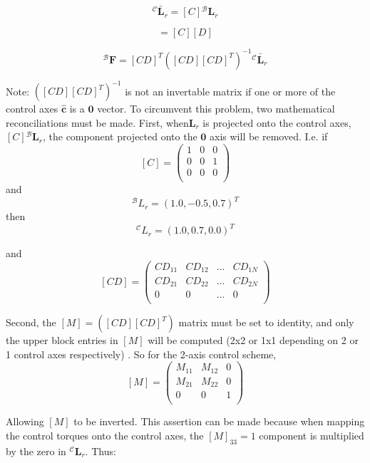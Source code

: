 \begin{equation}
	{}^{\mathcal{C}}\bar{\bm L}_{r} = [C] {}^{\mathcal{B}}\bm L_{r}
\end{equation}

\begin{equation}
	[CD] = [C][D]
\end{equation}

\begin{equation}
	\label{eq:th:min}
	{}^{\mathcal{B}}\bm F = [CD]^{T}([CD][CD]^{T})^{-1} {}^{\mathcal{C}}\bar{\bm L}_{r}
\end{equation}

Note: $([CD][CD]^{T})^{-1}$ is not an invertable matrix if one or more of the control axes $\hat{\bm c}$ is a $\bm 0$ vector. To circumvent this problem, two mathematical reconciliations must be made. First, when$\bm L_r$ is projected onto the control axes,  $[C] {}^{\mathcal{B}}\bm L_{r}$, the component projected onto the $\bm 0$ axis will be removed. I.e. if 
$$ [C] = \begin{pmatrix}
1 & 0 & 0 \\
0 & 0 & 1 \\
0 & 0 & 0 \\
\end{pmatrix} $$
and 
$$ \bm {}^{\mathcal B}L_r = (1.0, -0.5, 0.7)^T $$
then 
$$ \bm {}^{\mathcal C}L_r = (1.0, 0.7, 0.0)^T $$

and 
 $$ [CD] = \begin{pmatrix}
CD_{11} & CD_{12} & \hdots & CD_{1N} \\
CD_{21} & CD_{22} & \hdots & CD_{2N} \\
0 & 0 &  \hdots & 0 \\
\end{pmatrix} $$

Second, the $[M]=([CD][CD]^{T})$ matrix must be set to identity, and only the upper block entries in $[M]$ will be computed (2x2 or 1x1 depending on 2 or 1 control axes respectively) . So for the 2-axis control scheme,
 $$ [M] = \begin{pmatrix}
M_{11} & M_{12} & 0 \\
M_{21} & M_{22} & 0 \\
0 & 0 & 1 \\
\end{pmatrix} $$

Allowing $[M]$ to be inverted. This assertion can be made because when mapping the control torques onto the control axes, the $[M]_{33} =1$ component is multiplied by the zero in ${}^{\mathcal{C}}\bm L_r$. Thus:

